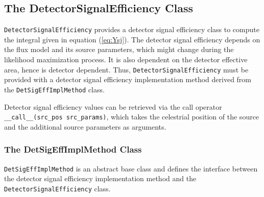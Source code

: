 \documentclass{article}
\newcommand{\eq}[1]{(\ref{#1})}
\newcommand{\code}[1]{\texttt{#1}}
\newcommand{\class}[1]{\colorbox{blue!30}{\code{#1}}}
\begin{document}
\subsection{The DetectorSignalEfficiency Class}

\class{DetectorSignalEfficiency} provides a detector signal efficiency class to
compute the integral given in equation \eq{eq:Ysj}. The detector signal
efficiency depends on the flux model and its source parameters, which might
change during the likelihood maximization process. It is also dependent on the
detector effective area, hence is detector dependent. Thus,
\class{DetectorSignalEfficiency} must be provided with a detector signal
efficiency implementation method derived from the \class{DetSigEffImplMethod}
class.

Detector signal efficiency values can be retrieved via the call operator
\code{\_\_call\_\_(src\_pos src\_params)}, which takes the celestrial position
of the source and the additional source parameters as arguments.

\subsubsection{The DetSigEffImplMethod Class}

\class{DetSigEffImplMethod} is an abstract base class and defines the interface
between the detector signal efficiency implementation method and the
\class{DetectorSignalEfficiency} class.
\end{document}
